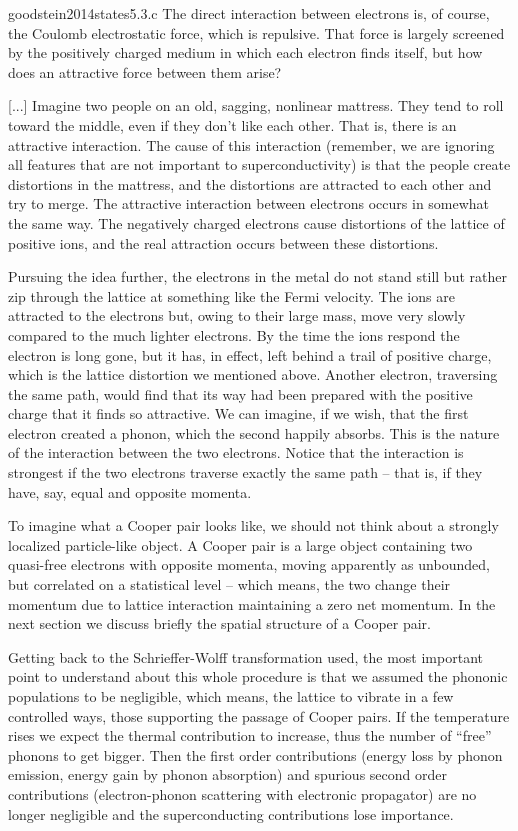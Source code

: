 \begin{cit}{goodstein2014states}{5.3.c}
	The direct interaction between electrons is, of course, the Coulomb electrostatic force, which is repulsive. That force is largely screened by the positively charged medium in which each electron finds itself, but how does an attractive force between them arise? 
	
	[...] Imagine two people on an old, sagging, nonlinear mattress. They tend to roll toward the middle, even if they don't like each other. That is, there is an attractive interaction. The cause of this interaction (remember, we are ignoring all features that are not important to superconductivity) is that the people create distortions in the mattress, and the distortions are attracted to each other and try to merge. The attractive interaction between electrons occurs in somewhat the same way. The negatively charged electrons cause distortions of the lattice of positive ions, and the real attraction occurs between these distortions.
	
	Pursuing the idea further, the electrons in the metal do not stand still but rather zip through the lattice at something like the Fermi velocity. The ions are attracted to the electrons but, owing to their large mass, move very slowly compared to the much lighter electrons. By the time the ions respond the electron is long gone, but it has, in effect, left behind a trail of positive charge, which is the lattice distortion we mentioned above. Another electron, traversing the same path, would find that its way had been prepared with the positive charge that it finds so attractive. We can imagine, if we wish, that the first electron created a phonon, which the second happily absorbs. This is the nature of the interaction between the two electrons. Notice that the interaction is strongest if the two electrons traverse exactly the same path -- that is, if they have, say, equal and opposite momenta.
\end{cit}

To imagine what a Cooper pair looks like, we should not think about a strongly localized particle-like object. A Cooper pair is a large object containing two quasi-free electrons with opposite momenta, moving apparently as unbounded, but correlated on a statistical level -- which means, the two change their momentum due to lattice interaction maintaining a zero net momentum. In the next section we discuss briefly the spatial structure of a Cooper pair.

Getting back to the Schrieffer-Wolff transformation used, the most important point to understand about this whole procedure is that we assumed the phononic populations to be negligible, which means, the lattice to vibrate in a few controlled ways, those supporting the passage of Cooper pairs. If the temperature rises we expect the thermal contribution to increase, thus the number of ``free'' phonons to get bigger. Then the first order contributions (energy loss by phonon emission, energy gain by phonon absorption) and spurious second order contributions (electron-phonon scattering with electronic propagator) are no longer negligible and the superconducting contributions lose importance.

